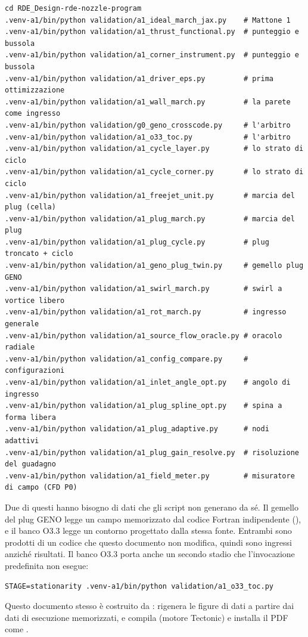 \begin{lstlisting}
cd RDE_Design-rde-nozzle-program
.venv-a1/bin/python validation/a1_ideal_march_jax.py    # Mattone 1
.venv-a1/bin/python validation/a1_thrust_functional.py  # punteggio e bussola
.venv-a1/bin/python validation/a1_corner_instrument.py  # punteggio e bussola
.venv-a1/bin/python validation/a1_driver_eps.py         # prima ottimizzazione
.venv-a1/bin/python validation/a1_wall_march.py         # la parete come ingresso
.venv-a1/bin/python validation/g0_geno_crosscode.py     # l'arbitro
.venv-a1/bin/python validation/a1_o33_toc.py            # l'arbitro
.venv-a1/bin/python validation/a1_cycle_layer.py        # lo strato di ciclo
.venv-a1/bin/python validation/a1_cycle_corner.py       # lo strato di ciclo
.venv-a1/bin/python validation/a1_freejet_unit.py       # marcia del plug (cella)
.venv-a1/bin/python validation/a1_plug_march.py         # marcia del plug
.venv-a1/bin/python validation/a1_plug_cycle.py         # plug troncato + ciclo
.venv-a1/bin/python validation/a1_geno_plug_twin.py     # gemello plug GENO
.venv-a1/bin/python validation/a1_swirl_march.py        # swirl a vortice libero
.venv-a1/bin/python validation/a1_rot_march.py          # ingresso generale
.venv-a1/bin/python validation/a1_source_flow_oracle.py # oracolo radiale
.venv-a1/bin/python validation/a1_config_compare.py     # configurazioni
.venv-a1/bin/python validation/a1_inlet_angle_opt.py    # angolo di ingresso
.venv-a1/bin/python validation/a1_plug_spline_opt.py    # spina a forma libera
.venv-a1/bin/python validation/a1_plug_adaptive.py      # nodi adattivi
.venv-a1/bin/python validation/a1_plug_gain_resolve.py  # risoluzione del guadagno
.venv-a1/bin/python validation/a1_field_meter.py        # misuratore di campo (CFD P0)
\end{lstlisting}

Due di questi hanno bisogno di dati che gli script non generano da
sé. Il gemello del plug GENO legge un campo memorizzato dal codice
Fortran indipendente (), e il banco
O3.3 legge un contorno progettato dalla stessa fonte. Entrambi sono
prodotti di un codice che questo documento non modifica, quindi sono
ingressi anziché risultati. Il banco O3.3 porta anche un secondo
stadio che l'invocazione predefinita non esegue:

\begin{lstlisting}
STAGE=stationarity .venv-a1/bin/python validation/a1_o33_toc.py
\end{lstlisting}

Questo documento stesso è costruito da
:  rigenera le
figure di dati a partire dai dati di esecuzione memorizzati, e
 compila  (motore Tectonic) e installa
il PDF come .

